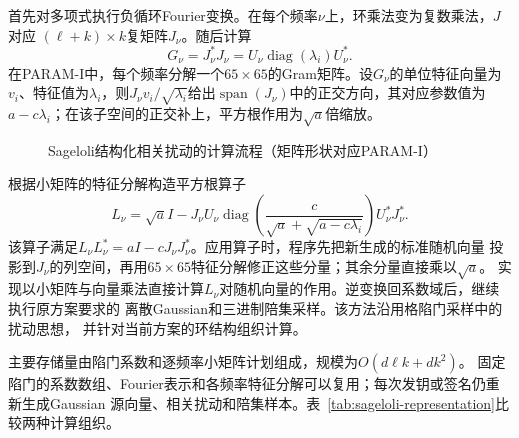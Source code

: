 首先对多项式执行负循环Fourier变换。在每个频率$\nu$上，环乘法变为复数乘法，$J$对应
$(\ell+k)\times k$复矩阵$J_\nu$。随后计算
\[
 G_\nu=J_\nu^*J_\nu
      =U_\nu\operatorname{diag}(\lambda_i)U_\nu^*.
\]
在PARAM-I中，每个频率分解一个$65\times65$的Gram矩阵。设$G_\nu$的单位特征向量为$v_i$、特征值为$\lambda_i$，则$J_\nu v_i/\sqrt{\lambda_i}$给出$\operatorname{span}(J_\nu)$中的正交方向，其对应参数值为$a-c\lambda_i$；在该子空间的正交补上，平方根作用为$\sqrt a$倍缩放。

\begin{figure}[H]
\centering
{}
\caption{Sageloli结构化相关扰动的计算流程（矩阵形状对应PARAM-I）}
\label{fig:ring-sampler}
\end{figure}

根据小矩阵的特征分解构造平方根算子
\[
 L_\nu=\sqrt a I-
 J_\nu U_\nu\operatorname{diag}\!\left(
 \frac{c}{\sqrt a+\sqrt{a-c\lambda_i}}
 \right)U_\nu^*J_\nu^*.
\]
该算子满足$L_\nu L_\nu^*=aI-cJ_\nu J_\nu^*$。应用算子时，程序先把新生成的标准随机向量
投影到$J_\nu$的列空间，再用$65\times65$特征分解修正这些分量；其余分量直接乘以$\sqrt a$。
实现以小矩阵与向量乘法直接计算$L_\nu$对随机向量的作用。逆变换回系数域后，继续执行原方案要求的
离散Gaussian和三进制陪集采样。该方法沿用格陷门采样中的扰动思想\cite{micciancio2012trapdoors}，
并针对当前方案的环结构组织计算。

主要存储量由陷门系数和逐频率小矩阵计划组成，规模为$O(d\ell k+dk^2)$。
固定陷门的系数数组、Fourier表示和各频率特征分解可以复用；每次发钥或签名仍重新生成Gaussian
源向量、相关扰动和陪集样本。表~\ref{tab:sageloli-representation}比较两种计算组织。

